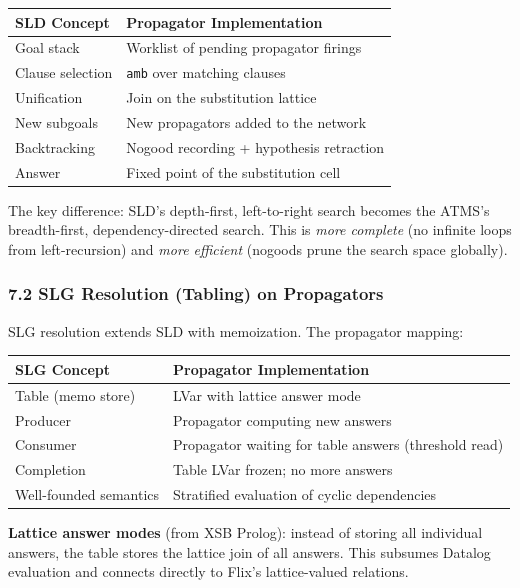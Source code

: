 \documentclass[11pt]{article}
\begin{document}
\begin{center}
\begin{tabular}{ll}
SLD Concept & Propagator Implementation\\
\hline
Goal stack & Worklist of pending propagator firings\\
Clause selection & \texttt{amb} over matching clauses\\
Unification & Join on the substitution lattice\\
New subgoals & New propagators added to the network\\
Backtracking & Nogood recording + hypothesis retraction\\
Answer & Fixed point of the substitution cell\\
\end{tabular}
\end{center}

The key difference: SLD's depth-first, left-to-right search becomes the
ATMS's breadth-first, dependency-directed search. This is \emph{more complete}
(no infinite loops from left-recursion) and \emph{more efficient} (nogoods
prune the search space globally).
\subsubsection{7.2 SLG Resolution (Tabling) on Propagators}
\label{sec:org47d5184}

SLG resolution extends SLD with memoization. The propagator mapping:

\begin{center}
\begin{tabular}{ll}
SLG Concept & Propagator Implementation\\
\hline
Table (memo store) & LVar with lattice answer mode\\
Producer & Propagator computing new answers\\
Consumer & Propagator waiting for table answers (threshold read)\\
Completion & Table LVar frozen; no more answers\\
Well-founded semantics & Stratified evaluation of cyclic dependencies\\
\end{tabular}
\end{center}

\textbf{Lattice answer modes} (from XSB Prolog): instead of storing all
individual answers, the table stores the lattice join of all answers.
This subsumes Datalog evaluation and connects directly to Flix's
lattice-valued relations.
\end{document}
